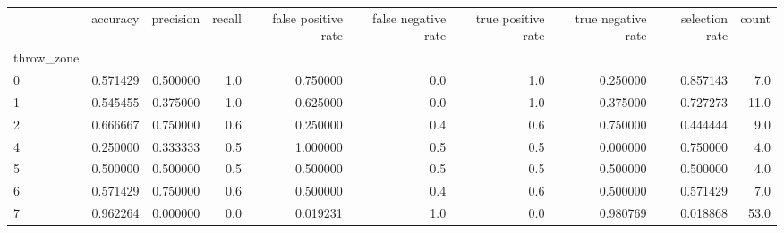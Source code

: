 \begin{tabular}{lrrrrrrrrr}
\toprule
{} &  accuracy &  precision &  recall &  false positive rate &  false negative rate &  true positive rate &  true negative rate &  selection rate &  count \\
throw\_zone &           &            &         &                      &                      &                     &                     &                 &        \\
\midrule
0          &  0.571429 &   0.500000 &     1.0 &             0.750000 &                  0.0 &                 1.0 &            0.250000 &        0.857143 &    7.0 \\
1          &  0.545455 &   0.375000 &     1.0 &             0.625000 &                  0.0 &                 1.0 &            0.375000 &        0.727273 &   11.0 \\
2          &  0.666667 &   0.750000 &     0.6 &             0.250000 &                  0.4 &                 0.6 &            0.750000 &        0.444444 &    9.0 \\
4          &  0.250000 &   0.333333 &     0.5 &             1.000000 &                  0.5 &                 0.5 &            0.000000 &        0.750000 &    4.0 \\
5          &  0.500000 &   0.500000 &     0.5 &             0.500000 &                  0.5 &                 0.5 &            0.500000 &        0.500000 &    4.0 \\
6          &  0.571429 &   0.750000 &     0.6 &             0.500000 &                  0.4 &                 0.6 &            0.500000 &        0.571429 &    7.0 \\
7          &  0.962264 &   0.000000 &     0.0 &             0.019231 &                  1.0 &                 0.0 &            0.980769 &        0.018868 &   53.0 \\
\bottomrule
\end{tabular}
